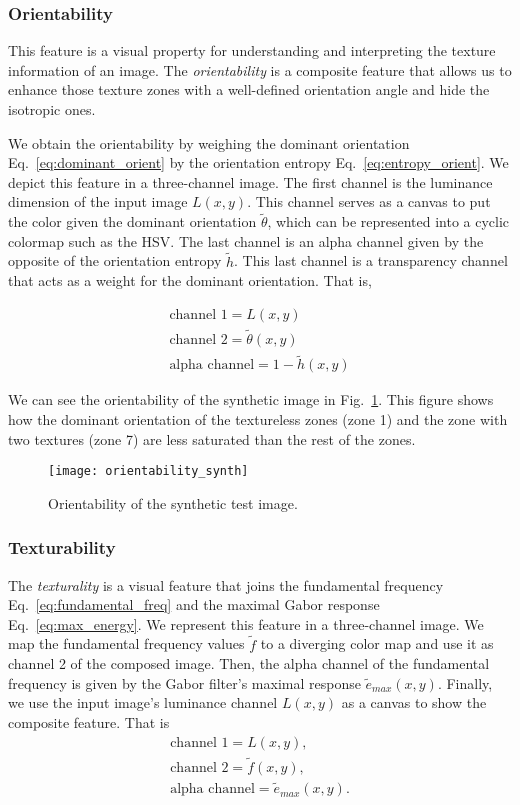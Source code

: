 \subsubsection{Orientability}
This feature is a visual property for understanding and interpreting the texture information of an image. The \textit{orientability} is a composite feature that allows us to enhance those texture zones with a well-defined orientation angle and hide the isotropic ones.

We obtain the orientability by weighing the dominant orientation Eq.\ \eqref{eq:dominant_orient} by the orientation entropy Eq.\ \eqref{eq:entropy_orient}. We depict this feature in a three-channel image. The first channel is the luminance dimension of the input image $L(x,y)$. This channel serves as a canvas to put the color given the dominant orientation $\widetilde{\theta}$, which can be represented into a cyclic colormap such as the HSV. The last channel is an alpha channel given by the opposite of the orientation entropy $\widetilde{h}$. This last channel is a transparency channel that acts as a weight for the dominant orientation. That is,

\begin{gather}
    \text{channel 1} = L(x,y) \\
    \text{channel 2} = \widetilde{\theta}(x,y) \\
    \text{alpha channel}= 1 - \widetilde{h}(x,y)
\end{gather}

We can see the orientability of the synthetic image in Fig.\ \ref{fig:orientability_synth}. This figure shows how the dominant orientation of the textureless zones (zone 1) and the zone with two textures (zone 7) are less saturated than the rest of the zones. 

\begin{figure}[!ht]
	\texttt{[image: orientability\_synth]}
    \caption{Orientability of the synthetic test image.}
    \label{fig:orientability_synth}
\end{figure}

\subsubsection{Texturability}
The \textit{texturality} is a visual feature that joins the fundamental frequency Eq.\ \eqref{eq:fundamental_freq} and the maximal Gabor response Eq.\ \eqref{eq:max_energy}. We represent this feature in a three-channel image. We map the fundamental frequency values $\widetilde{f}$ to a diverging color map and use it as channel 2 of the composed image. Then, the alpha channel of the fundamental frequency is given by the Gabor filter's maximal response $\widetilde{e}_{max}(x,y)$. Finally, we use the input image's luminance channel $L(x,y)$ as a canvas to show the composite feature. That is
\begin{gather}
    \text{channel 1} = L(x,y), \\
    \text{channel 2} = \widetilde{f}(x,y), \\
    \text{alpha channel} = \widetilde{e}_{max}(x,y). 
\end{gather}

